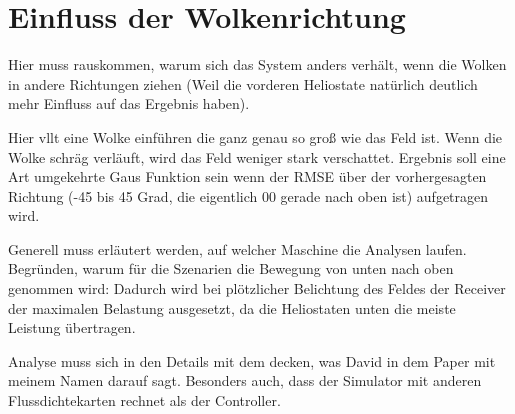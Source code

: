 \section{Einfluss der Wolkenrichtung} \label{sec_EinflussRichtung}
Hier muss rauskommen, warum sich das System anders verhält, wenn die Wolken in andere Richtungen ziehen (Weil die vorderen Heliostate natürlich deutlich mehr Einfluss auf das Ergebnis haben).

Hier vllt eine Wolke einführen die ganz genau so groß wie das Feld ist.
Wenn die Wolke schräg verläuft, wird das Feld weniger stark verschattet.
Ergebnis soll eine Art umgekehrte Gaus Funktion sein wenn der RMSE über der vorhergesagten Richtung (-45 bis 45 Grad, die eigentlich 00 gerade nach oben ist) aufgetragen wird.


Generell muss erläutert werden, auf welcher Maschine die Analysen laufen.
Begründen, warum für die Szenarien die Bewegung von unten nach oben genommen wird: Dadurch wird bei plötzlicher Belichtung des Feldes der Receiver der maximalen Belastung ausgesetzt, da die Heliostaten unten die meiste Leistung übertragen.

Analyse muss sich in den Details mit dem decken, was David in dem Paper mit meinem Namen darauf sagt.
Besonders auch, dass der Simulator mit anderen Flussdichtekarten rechnet als der Controller.
